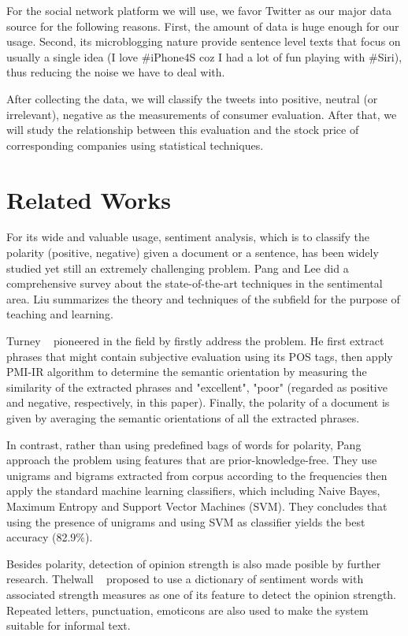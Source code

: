 \documentclass[12pt]{article}
\begin{document}
For the social network platform we will use, we favor Twitter as our major data source for the following reasons. First, the amount of data is huge enough for our usage. Second, its microblogging nature provide sentence level texts that focus on usually a single idea (I love \#iPhone4S coz I had a lot of fun playing with \#Siri), thus reducing the noise we have to deal with.

After collecting the data, we will classify the tweets into positive, neutral (or irrelevant), negative as the measurements of consumer evaluation. After that, we will study the relationship between this evaluation and the stock price of corresponding companies using statistical techniques.

\section{Related Works}
For its wide and valuable usage, sentiment analysis, which is to classify the polarity (positive, negative) given a document or a sentence, has been widely studied yet still an extremely challenging problem. Pang and Lee \cite{Pang:08} did a comprehensive survey about the state-of-the-art techniques in the sentimental area. Liu \cite{Liu:10} summarizes the theory and techniques of the subfield for the purpose of teaching and learning.

Turney \etal~\cite{Turney:02} pioneered in the field by firstly address the problem. He first extract phrases that might contain subjective evaluation using its POS tags, then apply PMI-IR algorithm \cite{Turney:01} to determine the semantic orientation by measuring the similarity of the extracted phrases and "excellent", "poor" (regarded as positive and negative, respectively, in this paper). Finally, the polarity of a document is given by averaging the semantic orientations of all the extracted phrases.

In contrast, rather than using predefined bags of words for polarity, Pang \etal~\cite{Pang:02} approach the problem using features that are prior-knowledge-free. They use unigrams and bigrams extracted from corpus according to the frequencies then apply the standard machine learning classifiers, which including Naive Bayes, Maximum Entropy and Support Vector Machines (SVM). They concludes that using the presence of unigrams and using SVM as classifier yields the best accuracy (82.9\%).

Besides polarity, detection of opinion strength is also made posible by further research. Thelwall \etal~\cite{Thelwall:10} proposed to use a dictionary of sentiment words with associated strength measures as one of its feature to detect the opinion strength. Repeated letters, punctuation, emoticons are also used to make the system suitable for informal text.
\end{document}
